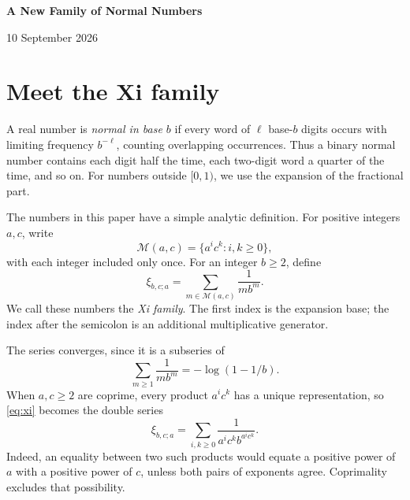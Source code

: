 \documentclass[11pt]{article}
\newcommand{\M}{\mathcal M}
\begin{document}
\begin{center}
{\LARGE\bfseries\color{inkblue} A New Family of Normal Numbers\par}
\vspace{9pt}
{\small 10 September 2026\par}
\end{center}

\begin{abstract}
We study the numbers \(\xi_{b,c;a}\), obtained by restricting the
logarithmic series to products of powers of \(a\) and \(c\). For
integers \(a,b,c\ge2\) with \(\gcd(c,ab)=1\), we prove normality in
base \(b\). More strongly, fixing \(a,b\) and varying the eligible
parameter \(c\), every finite rational combination of distinct members
with coefficients not all zero is normal, even after a rational translation. The
construction extends Stoneham numbers and includes values of Dibag's
localized logarithms. The proof follows the denominators of rational
approximations: one prime detects a contribution that the others cannot
cancel. Both main theorems have complete Lean formalizations.
\end{abstract}

\section{Meet the Xi family}

A real number is \emph{normal in base \(b\)} if every word of \(\ell\)
base-\(b\) digits occurs with limiting frequency \(b^{-\ell}\), counting
overlapping occurrences. Thus a binary normal number contains each digit
half the time, each two-digit word a quarter of the time, and so on.
For numbers outside \([0,1)\), we use the expansion of the fractional part.

The numbers in this paper have a simple analytic definition. For positive
integers \(a,c\), write
\[
 \M(a,c)=\{a^i c^k:i,k\ge0\},
\]
with each integer included only once. For an integer \(b\ge2\), define
\begin{equation}\label{eq:xi}
 \boxed{\displaystyle
 \xi_{b,c;a}=\sum_{m\in\M(a,c)}\frac1{m b^m}.}
\end{equation}
We call these numbers the \emph{Xi family}. The first index is the
expansion base; the index after the semicolon is an additional
multiplicative generator.

The series converges, since it is a subseries of
\[
 \sum_{m\ge1}\frac1{m b^m}=-\log(1-1/b).
\]
When \(a,c\ge2\) are coprime, every product \(a^ic^k\) has a unique
representation, so \eqref{eq:xi} becomes the double series
\begin{equation}\label{eq:double}
 \xi_{b,c;a}=\sum_{i,k\ge0}\frac1{a^i c^k b^{a^i c^k}}.
\end{equation}
Indeed, an equality between two such products would equate a positive
power of \(a\) with a positive power of \(c\), unless both pairs of
exponents agree. Coprimality excludes that possibility.
\end{document}
